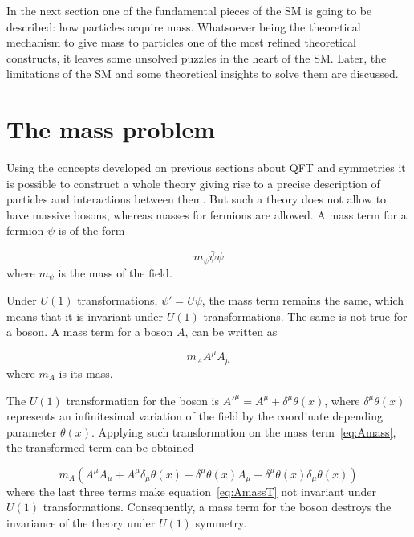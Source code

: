 In the next section one of the fundamental pieces of the SM is going to be described: how particles acquire mass. Whatsoever being the theoretical mechanism to give mass to particles one of the most refined theoretical constructs, it leaves some unsolved puzzles in the heart of the SM. Later, the limitations of the SM and some theoretical insights to solve them are discussed.

\section{The mass problem}
\label{sec:mass}

Using the concepts developed on previous sections about QFT and symmetries it is possible to construct a whole theory giving rise to a precise description of particles and interactions between them. But such a theory does not allow to have massive bosons, whereas masses for fermions are allowed. A mass term for a fermion $\psi$ is of the form 

\begin{equation*}
  m_{\psi}\bar{\psi}\psi
\end{equation*} where $m_{\psi}$ is the mass of the field.

Under $U(1)$ transformations, $\psi'=U \psi$, the mass term remains the same, which means that it is invariant under $U(1)$ transformations. The same is not true for a boson. A mass term for a boson $A$, can be written as 

\begin{equation}
  \label{eq:Amass}
  m_{A}A^{\mu}A_{\mu}
\end{equation} where $m_{A}$ is its mass.

The $U(1)$ transformation for the boson is $A'^{\mu}=A^{\mu}+\delta^{\mu}\theta(x)$, where $\delta^{\mu}\theta(x)$ represents an infinitesimal variation of the field by the coordinate depending parameter $\theta(x)$. Applying such transformation on the mass term~\ref{eq:Amass}, the transformed term can be obtained

\begin{equation}
  \label{eq:AmassT}
  m_{A}\left(A^{\mu}A_{\mu}+A^{\mu}\delta_{\mu}\theta(x)+\delta^{\mu}\theta(x)A_{\mu}+\delta^{\mu}\theta(x)\delta_{\mu}\theta(x)\right)
\end{equation}where the last three terms make equation~\ref{eq:AmassT} not invariant under $U(1)$ transformations. Consequently, a mass term for the boson destroys the invariance of the theory under $U(1)$ symmetry.

